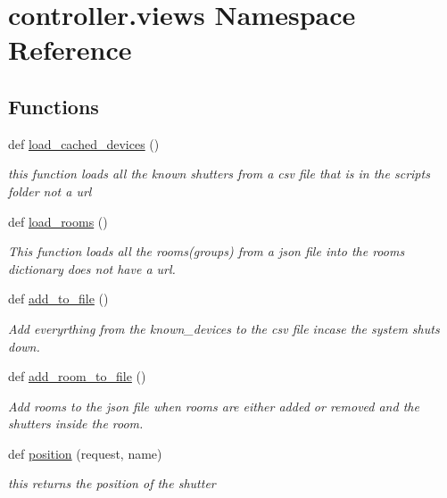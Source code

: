 \hypertarget{namespacecontroller_1_1views}{}\section{controller.\+views Namespace Reference}
\label{namespacecontroller_1_1views}
\subsection*{Functions}
\begin{DoxyCompactItemize}
\item 
def \hyperlink{namespacecontroller_1_1views_a981a57611ae7537ed58369b7d4476a65}{load\+\_\+cached\+\_\+devices} ()
\begin{DoxyCompactList}\small\item\em this function loads all the known shutters from a csv file that is in the scripts folder not a url \end{DoxyCompactList}\item 
def \hyperlink{namespacecontroller_1_1views_a7d95618cd1b42c41c244c565d20fed55}{load\+\_\+rooms} ()
\begin{DoxyCompactList}\small\item\em This function loads all the rooms(groups) from a json file into the rooms dictionary does not have a url. \end{DoxyCompactList}\item 
def \hyperlink{namespacecontroller_1_1views_a26ce91aeba8c9d300306419ee86b812e}{add\+\_\+to\+\_\+file} ()
\begin{DoxyCompactList}\small\item\em Add everyrthing from the known\+\_\+devices to the csv file incase the system shuts down. \end{DoxyCompactList}\item 
def \hyperlink{namespacecontroller_1_1views_ab9bc1ef91482004a9fd83274f0d24fc0}{add\+\_\+room\+\_\+to\+\_\+file} ()
\begin{DoxyCompactList}\small\item\em Add rooms to the json file when rooms are either added or removed and the shutters inside the room. \end{DoxyCompactList}\item 
def \hyperlink{namespacecontroller_1_1views_af4a1b79435d815cad6aa25c3c45aa080}{position} (request, name)
\begin{DoxyCompactList}\small\item\em this returns the position of the shutter \end{DoxyCompactList}\item 

\end{DoxyCompactItemize}
